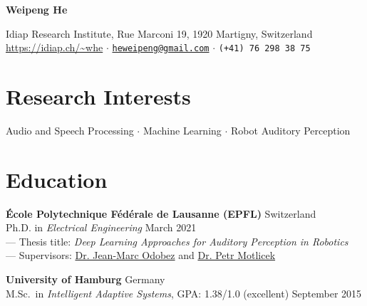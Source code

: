 \documentclass[a4paper,9pt]{extarticle} %
\newcommand{\ind}{\hspace*{1em}}
\begin{document}
\thispagestyle{empty}


\begin{center}
  {\Huge\bfseries\sffamily Weipeng He}

  \sffamily Idiap Research Institute, Rue Marconi 19, 1920 Martigny, Switzerland \\
  \url{https://idiap.ch/~whe} $\cdotp$
  \href{mailto:heweipeng@gmail.com}{\texttt{heweipeng@gmail.com}} $\cdotp$
  \texttt{(+41) 76 298 38 75}
\end{center}


\section{Research Interests}
\begin{center}
Audio and Speech Processing $\cdotp$ Machine Learning $\cdotp$ Robot Auditory Perception
\end{center}


\section{Education}
\textbf{\'Ecole Polytechnique F\'ed\'erale de Lausanne (EPFL)} \hfill Switzerland \\
\ind{} Ph.D. in \textit{Electrical Engineering} \hfill March 2021 \\
\ind{} --- Thesis title: \textit{Deep Learning Approaches for Auditory Perception in Robotics} \\
\ind{} --- Supervisors: \href{https://idiap.ch/~odobez}{Dr. Jean-Marc Odobez} and \href{https://people.idiap.ch/pmotlic}{Dr. Petr Motlicek}

\textbf{University of Hamburg} \hfill Germany \\
\ind{} M.Sc.\ in \textit{Intelligent Adaptive Systems}, GPA\@: 1.38/1.0 (excellent)  \hfill September 2015%
\end{document}

